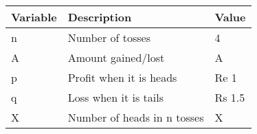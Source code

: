 \begin{tabular}{|l|l|l|}\hline
Variable	&Description	&Value\\\hline
n	&Number of tosses	&4\\\hline
A	&Amount gained/lost	&A\\\hline
p	&Profit when it is heads	&Re 1\\\hline
q	&Loss when it is tails		&Rs 1.5\\\hline
X	&Number of heads in n tosses	&X\\\hline
\end{tabular}

